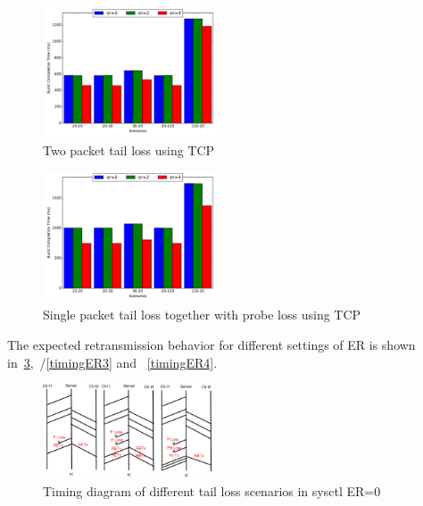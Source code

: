 \documentclass[10pt,draftcls,twocolumn]{IEEEconf}
\begin{document}
\begin{figure}[!ht]
\begin{center}
\includegraphics[angle=0, width=0.46\textwidth,natwidth=578.16,natheight=433.62]{plots/T2P.pdf}
\caption{Two packet tail loss using TCP}\label{t2p}
\end{center}
\end{figure}


\begin{figure}[!ht]
\begin{center}
\includegraphics[angle=0, width=0.46\textwidth, natwidth=578.16,natheight=433.62]{plots/T1PP.pdf}
\caption{Single packet tail loss together with probe loss using TCP}\label{t1pp}
\end{center}
\end{figure}








The expected retransmission behavior for different settings of ER is shown 
in~\ref{timingER0},~/\ref{timingER3} and ~\ref{timingER4}.

\begin{figure}[!ht]
\begin{center}
\includegraphics[angle=0, width=0.45\textwidth, natwidth=610, natheight=400]{images/timingER0.pdf}
\end{center}
\caption{Timing diagram of different tail loss scenarios in sysctl ER=0}\label{timingER0}
\end{figure}
\end{document}
